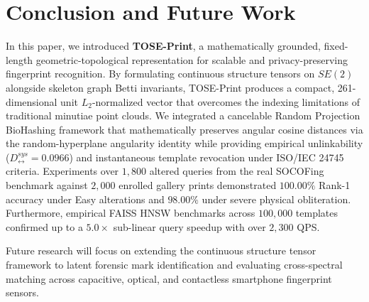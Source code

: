 \documentclass[lettersize,journal]{IEEEtran}
\begin{document}
\section{Conclusion and Future Work}
\label{sec:conclusion}
In this paper, we introduced \textbf{TOSE-Print}, a mathematically grounded, fixed-length geometric-topological representation for scalable and privacy-preserving fingerprint recognition. By formulating continuous structure tensors on $SE(2)$ alongside skeleton graph Betti invariants, TOSE-Print produces a compact, 261-dimensional unit $L_2$-normalized vector that overcomes the indexing limitations of traditional minutiae point clouds. We integrated a cancelable Random Projection BioHashing framework that mathematically preserves angular cosine distances via the random-hyperplane angularity identity while providing empirical unlinkability ($D_{\leftrightarrow}^{sys} = 0.0966$) and instantaneous template revocation under ISO/IEC 24745 criteria. Experiments over $1,800$ altered queries from the real SOCOFing benchmark against $2,000$ enrolled gallery prints demonstrated $100.00\%$ Rank-1 accuracy under Easy alterations and $98.00\%$ under severe physical obliteration. Furthermore, empirical FAISS HNSW benchmarks across $100,000$ templates confirmed up to a $5.0\times$ sub-linear query speedup with over $2,300$ QPS. 

Future research will focus on extending the continuous structure tensor framework to latent forensic mark identification and evaluating cross-spectral matching across capacitive, optical, and contactless smartphone fingerprint sensors.
\end{document}
